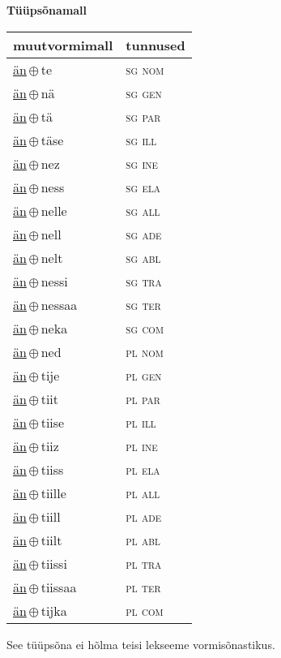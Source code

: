 

\vspace{3.5em}
\noindent \begin{minipage}{\textwidth}
\noindent \textbf{Tüüpsõnamall \,}\\

\begin{sideways}
\begin{tabular}{l l}
muutvormimall & tunnused \\
\hline
\underline{än}\,$\oplus$\,te & \textsc{ sg nom } \\
\underline{än}\,$\oplus$\,nä & \textsc{ sg gen } \\
\underline{än}\,$\oplus$\,tä & \textsc{ sg par } \\
\underline{än}\,$\oplus$\,täse & \textsc{ sg ill } \\
\underline{än}\,$\oplus$\,nez & \textsc{ sg ine } \\
\underline{än}\,$\oplus$\,ness & \textsc{ sg ela } \\
\underline{än}\,$\oplus$\,nelle & \textsc{ sg all } \\
\underline{än}\,$\oplus$\,nell & \textsc{ sg ade } \\
\underline{än}\,$\oplus$\,nelt & \textsc{ sg abl } \\
\underline{än}\,$\oplus$\,nessi & \textsc{ sg tra } \\
\underline{än}\,$\oplus$\,nessaa & \textsc{ sg ter } \\
\underline{än}\,$\oplus$\,neka & \textsc{ sg com } \\
\underline{än}\,$\oplus$\,ned & \textsc{ pl nom } \\
\underline{än}\,$\oplus$\,tije & \textsc{ pl gen } \\
\underline{än}\,$\oplus$\,tiit & \textsc{ pl par } \\
\underline{än}\,$\oplus$\,tiise & \textsc{ pl ill } \\
\underline{än}\,$\oplus$\,tiiz & \textsc{ pl ine } \\
\underline{än}\,$\oplus$\,tiiss & \textsc{ pl ela } \\
\underline{än}\,$\oplus$\,tiille & \textsc{ pl all } \\
\underline{än}\,$\oplus$\,tiill & \textsc{ pl ade } \\
\underline{än}\,$\oplus$\,tiilt & \textsc{ pl abl } \\
\underline{än}\,$\oplus$\,tiissi & \textsc{ pl tra } \\
\underline{än}\,$\oplus$\,tiissaa & \textsc{ pl ter } \\
\underline{än}\,$\oplus$\,tijka & \textsc{ pl com } \\
\end{tabular}
\end{sideways}
\label{tab:tüüpsõnamall-änte}

\end{minipage}

 
\vspace{1em}
\noindent See tüüpsõna ei hõlma teisi lekseeme vormi\-sõnastikus.

